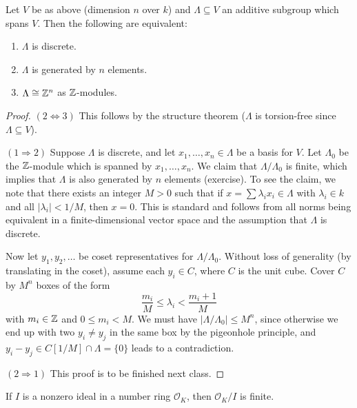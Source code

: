 \begin{prop}
  Let $V$ be as above (dimension $n$ over $k$) and
  $\Lambda \subseteq V$ an additive subgroup which
  spans $V$. Then the following are equivalent:
  \begin{enumerate}
    \item $\Lambda$ is discrete.
    \item $\Lambda$ is generated by $n$ elements.
    \item $\Lambda \cong \mathbb{Z}^n$ as $\mathbb{Z}$-modules.
  \end{enumerate}
\end{prop}

\begin{proof}
  $(2 \Leftrightarrow 3)$ This follows by the structure
  theorem ($\Lambda$ is torsion-free since
  $\Lambda \subseteq V$).

  $(1 \Rightarrow 2)$ Suppose $\Lambda$ is discrete, and
  let $x_1, \dots, x_n \in \Lambda$ be a basis for $V$.
  Let $\Lambda_0$ be the $\mathbb{Z}$-module which is
  spanned by $x_1, \dots, x_n$. We claim that
  $\Lambda / \Lambda_0$ is finite, which implies that
  $\Lambda$ is also generated by $n$ elements (exercise).
  To see the claim, we note that there exists
  an integer
  $M > 0$ such that if
  $x = \sum \lambda_i x_i \in \Lambda$ with
  $\lambda_i \in k$ and all $|\lambda_i| < 1 / M$,
  then $x = 0$. This is standard and follows from
  all norms being equivalent in a finite-dimensional
  vector space and the assumption that $\Lambda$ is
  discrete.

  Now let $y_1, y_2, \dots$ be coset representatives
  for $\Lambda / \Lambda_0$. Without loss of generality
  (by translating in the coset),
  assume each $y_i \in C$, where $C$ is the unit cube.
  Cover $C$ by $M^n$ boxes of the form
  \[
    \frac{m_i}{M} \le \lambda_i < \frac{m_i + 1}{M}
  \]
  with $m_i \in \mathbb{Z}$ and $0 \le m_i < M$. We must have
  $|\Lambda / \Lambda_0| \le M^n$, since otherwise
  we end up with two $y_i \ne y_j$ in the same box by the
  pigeonhole principle, and
  $y_i - y_j \in C[1 / M] \cap \Lambda = \{0\}$ leads
  to a contradiction.

  $(2 \Rightarrow 1)$ This proof is to be finished next
  class.
\end{proof}

\begin{theorem}
  If $I$ is a nonzero ideal in a number ring
  $\mathcal{O}_K$, then $\mathcal{O}_K / I$ is finite.
\end{theorem}

